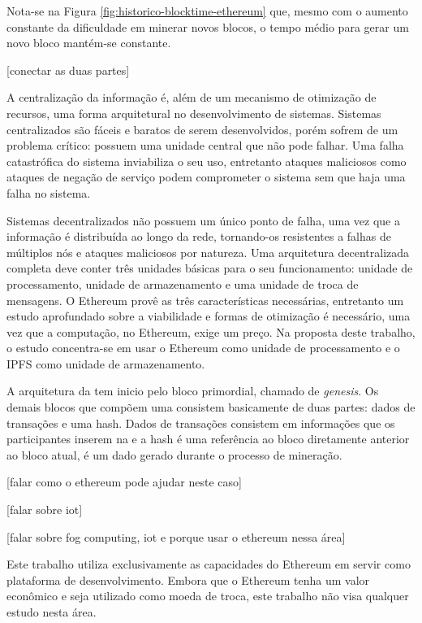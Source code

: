 \documentclass[tcc,capa]{texufpel}
\begin{document}
	Nota-se na Figura \ref{fig:historico-blocktime-ethereum} que, mesmo com o aumento constante da dificuldade em minerar novos blocos, o tempo médio para gerar um novo bloco mantém-se constante.
	
	[conectar as duas partes]
	
	A centralização da informação é, além de um mecanismo de otimização de recursos, uma forma arquitetural no desenvolvimento de sistemas. Sistemas centralizados são fáceis e baratos de serem desenvolvidos, porém sofrem de um problema crítico: possuem uma unidade central que não pode falhar. Uma falha catastrófica do sistema inviabiliza o seu uso, entretanto ataques maliciosos como ataques de negação de serviço podem comprometer o sistema sem que haja uma falha no sistema.
	
    Sistemas decentralizados não possuem um único ponto de falha, uma vez que a informação é distribuída ao longo da rede, tornando-os resistentes a falhas de múltiplos nós e ataques maliciosos por natureza. Uma arquitetura decentralizada completa deve conter três unidades básicas para o seu funcionamento: unidade de processamento, unidade de armazenamento e uma unidade de troca de mensagens. O Ethereum provê as três características necessárias, entretanto um estudo aprofundado sobre a viabilidade e formas de otimização é necessário, uma vez que a computação, no Ethereum, exige um preço. Na proposta deste trabalho, o estudo concentra-se em usar o Ethereum como unidade de processamento e o IPFS como unidade de armazenamento.
    
    A arquitetura da \bchain tem inicio pelo bloco primordial, chamado de \textit{genesis}. Os demais blocos que compõem uma \bchain consistem basicamente de duas partes: dados de transações e uma hash. Dados de transações consistem em informações que os participantes inserem na \bchain e a hash é uma referência ao bloco diretamente anterior ao bloco atual, é um dado gerado durante o processo de mineração.
	
	[falar como o ethereum pode ajudar neste caso]
	
	[falar sobre iot]
	
	[falar sobre fog computing, iot e porque usar o ethereum nessa área]
	
	Este trabalho utiliza exclusivamente as capacidades do Ethereum em servir como plataforma de desenvolvimento. Embora que o Ethereum tenha um valor econômico e seja utilizado como moeda de troca, este trabalho não visa qualquer estudo nesta área. 
	
\end{document}
